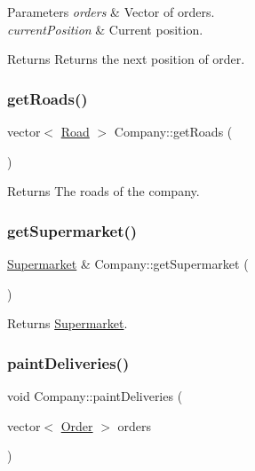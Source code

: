 \begin{DoxyParams}{Parameters}
{\em orders} & Vector of orders. \\
\hline
{\em current\+Position} & Current position.\\
\hline
\end{DoxyParams}
\begin{DoxyReturn}{Returns}
Returns the next position of order. 
\end{DoxyReturn}
\mbox{\label{class_company_ac6513a2b52e71b72d6325e2c4ab79c43}} 
\subsubsection{\texorpdfstring{get\+Roads()}{getRoads()}}
{\footnotesize\ttfamily vector$<$ \hyperlink{class_road}{Road} $>$ Company\+::get\+Roads (\begin{DoxyParamCaption}{ }\end{DoxyParamCaption})}

\begin{DoxyReturn}{Returns}
The roads of the company. 
\end{DoxyReturn}
\mbox{\label{class_company_ad875d99d9e04d1e5ea87510970444a21}} 
\subsubsection{\texorpdfstring{get\+Supermarket()}{getSupermarket()}}
{\footnotesize\ttfamily \hyperlink{class_supermarket}{Supermarket} \& Company\+::get\+Supermarket (\begin{DoxyParamCaption}{ }\end{DoxyParamCaption})}

\begin{DoxyReturn}{Returns}
\hyperlink{class_supermarket}{Supermarket}. 
\end{DoxyReturn}
\mbox{\label{class_company_ac6798bd8fb544d3297cb8b11becb5014}} 
\subsubsection{\texorpdfstring{paint\+Deliveries()}{paintDeliveries()}}
{\footnotesize\ttfamily void Company\+::paint\+Deliveries (\begin{DoxyParamCaption}\item[{vector$<$ \hyperlink{class_order}{Order} $>$}]{orders }\end{DoxyParamCaption})}



